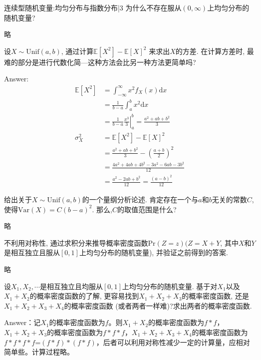 \newChapter 连续型随机变量:均匀分布与指数分布|3
\exer 为什么不存在服从$(0,\infty)$上均匀分布的随机变量?\par
略

\exer 设$X \sim\mathrm{Unif}(a, b)$, 通过计算$\mathbb{E}[X^2] -\mathbb{E}[X]^2$ 来求出$X$的方差. 在计算方差时, 最难的部分是进行代数化简---这种方法会比另一种方法更简单吗?\par
Answer: 
\begin{align*}
\mathbb{E}[X^2]&=\int_{-\infty}^\infty x^2f_X(x)\mathrm dx \\
&=\frac{1}{b-a}\int_a^b x^2\mathrm dx \\
&=\frac{1}{b-a}\left.\frac{x^3}{3}\right|_a^b = \frac{a^2+ab+b^2}{3} \\
\sigma_X^2 &  =\mathbb{E}[X^2] -\mathbb{E}[X]^2 \\
&=\frac{a^2+ab+b^2}{3} -\left(\frac{a+b}{2}\right)^2 \\
&=\frac{4a^2+4ab+4b^2-3a^2-6ab-3b^2}{12}  \\
&=\frac{a^2-2ab+b^2}{12}=\frac{(a-b)^2}{12} 
\end{align*}

\exer 给出关于$X \sim\mathrm{Unif}(a, b)$的一个量纲分析论述. 肯定存在一个与$a$和$b$无关的常数$C$, 使得$\mathrm{Var}(X) =C(b - a)^2$. 那么,$C$的取值范围是什么?\par
略

\exer 不利用对称性, 通过求积分来推导概率密度函数$\mathrm{Pr}(Z = z) (Z = X + Y$, 其中$X$和$Y$是相互独立且服从$[0, 1]$上均匀分布的随机变量), 并验证之前得到的答案.\par
略

\exer 设$X_1,X_2,\cdots$是相互独立且均服从$[0, 1]$上均匀分布的随机变量. 基于对$X_1$以及$X_1 + X_2$的概率密度函数的了解, 更容易找到$X_1+X_2+X_3$的概率密度函数, 还是$X_1 + X_2 + X_3 + X_4$的概率密度函数 (或者两者一样难)?求出两者的概率密度函数.\par
Answer：记$X_1$的概率密度函数为$f$。则$X_1+X_2$的概率密度函数为$f*f$，$X_1+X_2+X_3$的概率密度函数为$f*f*f$，$X_1 + X_2 + X_3 + X_4$的概率密度函数为$f*f*f*f$=$(f*f)*(f*f)$，后者可以利用对称性减少一定的计算量，应相对简单些。计算过程略。
